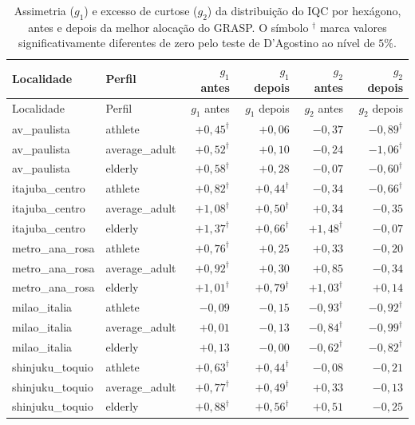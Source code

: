 \documentclass[11pt,a4paper]{article}
\begin{document}
\renewcommand{\arraystretch}{1.15}
\begin{longtable}{@{}l l r r r r@{}}
\caption{Assimetria ($g_1$) e excesso de curtose ($g_2$) da distribuição do IQC por hexágono, antes e depois da melhor alocação do GRASP. O símbolo $^{\dagger}$ marca valores significativamente diferentes de zero pelo teste de D'Agostino ao nível de $5\%$.}\label{tab:grasp-shape}\\
\toprule
Localidade & Perfil & $g_1$ antes & $g_1$ depois & $g_2$ antes & $g_2$ depois \\
\midrule
\endfirsthead
\toprule
Localidade & Perfil & $g_1$ antes & $g_1$ depois & $g_2$ antes & $g_2$ depois \\
\midrule
\endhead
av\_paulista & athlete & $+0{,}45^{\dagger}$ & $+0{,}06$ & $-0{,}37$ & $-0{,}89^{\dagger}$ \\
av\_paulista & average\_adult & $+0{,}52^{\dagger}$ & $+0{,}10$ & $-0{,}24$ & $-1{,}06^{\dagger}$ \\
av\_paulista & elderly & $+0{,}58^{\dagger}$ & $+0{,}28$ & $-0{,}07$ & $-0{,}60^{\dagger}$ \\
itajuba\_centro & athlete & $+0{,}82^{\dagger}$ & $+0{,}44^{\dagger}$ & $-0{,}34$ & $-0{,}66^{\dagger}$ \\
itajuba\_centro & average\_adult & $+1{,}08^{\dagger}$ & $+0{,}50^{\dagger}$ & $+0{,}34$ & $-0{,}35$ \\
itajuba\_centro & elderly & $+1{,}37^{\dagger}$ & $+0{,}66^{\dagger}$ & $+1{,}48^{\dagger}$ & $-0{,}07$ \\
metro\_ana\_rosa & athlete & $+0{,}76^{\dagger}$ & $+0{,}25$ & $+0{,}33$ & $-0{,}20$ \\
metro\_ana\_rosa & average\_adult & $+0{,}92^{\dagger}$ & $+0{,}30$ & $+0{,}85$ & $-0{,}34$ \\
metro\_ana\_rosa & elderly & $+1{,}01^{\dagger}$ & $+0{,}79^{\dagger}$ & $+1{,}03^{\dagger}$ & $+0{,}14$ \\
milao\_italia & athlete & $-0{,}09$ & $-0{,}15$ & $-0{,}93^{\dagger}$ & $-0{,}92^{\dagger}$ \\
milao\_italia & average\_adult & $+0{,}01$ & $-0{,}13$ & $-0{,}84^{\dagger}$ & $-0{,}99^{\dagger}$ \\
milao\_italia & elderly & $+0{,}13$ & $-0{,}00$ & $-0{,}62^{\dagger}$ & $-0{,}82^{\dagger}$ \\
shinjuku\_toquio & athlete & $+0{,}63^{\dagger}$ & $+0{,}44^{\dagger}$ & $-0{,}08$ & $-0{,}21$ \\
shinjuku\_toquio & average\_adult & $+0{,}77^{\dagger}$ & $+0{,}49^{\dagger}$ & $+0{,}33$ & $-0{,}13$ \\
shinjuku\_toquio & elderly & $+0{,}88^{\dagger}$ & $+0{,}56^{\dagger}$ & $+0{,}51$ & $-0{,}25$ \\
\bottomrule
\end{longtable}
\end{document}
